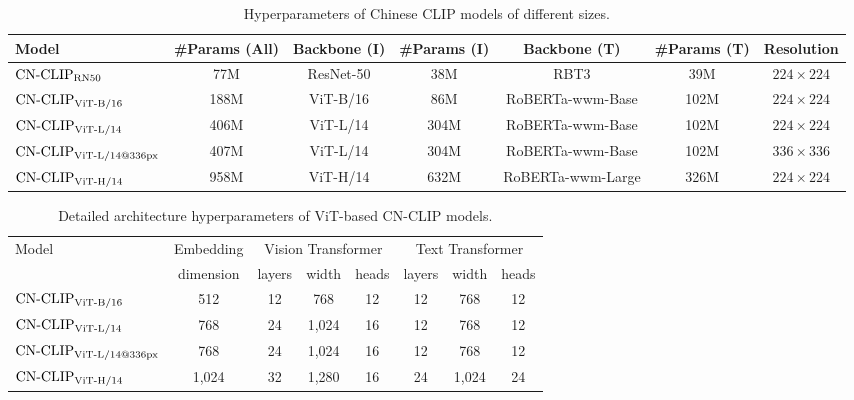 \documentclass[11pt]{article}
\begin{document}
\begin{table*}[t]
\center
\small
\vskip 0.15in
\begin{adjustbox}{max width=1.\textwidth}
\begin{tabular}{@{\extracolsep{\fill}}lcccccc}
\toprule
  Model
  & \#Params (All)
  & Backbone (I)
  & \#Params (I)
  & Backbone (T)
  & \#Params (T)
  & Resolution
  \\
\midrule
    $\text{CN-CLIP}\rm_{RN50}$
    & 77M & ResNet-50 & 38M & RBT3 & 39M & $224\times224$
    \\
    $\text{CN-CLIP}\rm_{ViT\text{-}B/16}$
    & 188M & ViT-B/16 & 86M & RoBERTa-wwm-Base & 102M & $224\times224$
    \\
    $\text{CN-CLIP}\rm_{ViT\text{-}L/14}$
    & 406M & ViT-L/14 & 304M & RoBERTa-wwm-Base & 102M & $224\times224$
    \\
    $\text{CN-CLIP}\rm_{ViT\text{-}L/14@336px}$
    & 407M & ViT-L/14 & 304M & RoBERTa-wwm-Base & 102M & $336\times336$
    \\
    $\text{CN-CLIP}\rm_{ViT\text{-}H/14}$
    & 958M & ViT-H/14 & 632M & RoBERTa-wwm-Large & 326M & $224\times224$
    \\
\bottomrule
\end{tabular}
\end{adjustbox}
\caption{Hyperparameters of Chinese CLIP models of different sizes. }
\label{tb:modelcard}
\end{table*} 
\begin{table*}[t]
\center
\small
\begin{tabular}{@{\extracolsep{\fill}}lccccccc}
\toprule
  \multirow{2}{*}{Model}
  & Embedding
  & \multicolumn{3}{c}{Vision Transformer}
  & \multicolumn{3}{c}{Text Transformer}
  \\
  & dimension
  & layers
  & width
  & heads
  & layers
  & width
  & heads
  \\
\midrule
$\text{CN-CLIP}\rm_{ViT\text{-}B/16}$
    & 512
    & 12
    & 768
    & 12
    & 12
    & 768
    & 12
    \\
    $\text{CN-CLIP}\rm_{ViT\text{-}L/14}$
    & 768
    & 24
    & 1,024
    & 16
    & 12
    & 768
    & 12
    \\
    $\text{CN-CLIP}\rm_{ViT\text{-}L/14@336px}$
    & 768
    & 24
    & 1,024
    & 16
    & 12
    & 768
    & 12
    \\
    $\text{CN-CLIP}\rm_{ViT\text{-}H/14}$
    & 1,024
    & 32
    & 1,280
    & 16
    & 24
    & 1,024
    & 24
    \\
\bottomrule
\end{tabular}
\caption{Detailed architecture hyperparameters of ViT-based CN-CLIP models.}
\label{tb:detailed_architecture_vit}
\end{table*}
\end{document}
